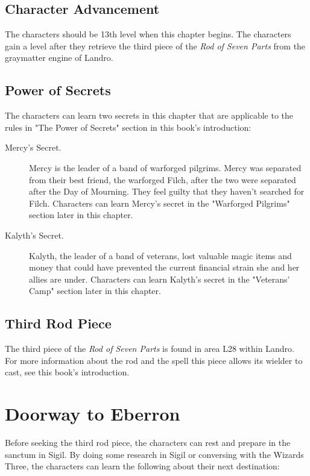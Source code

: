 \documentclass[10pt,a4paper,twoside,bg=print,twocolumn,openany,nodeprecatedcode]{dndbook}
\begin{document}
\subsection{Character Advancement}
The characters should be 13th level when this chapter begins. The characters gain a level after they retrieve the third piece of the \textit{Rod of Seven Parts} from the graymatter engine of Landro.

\subsection{Power of Secrets}
The characters can learn two secrets in this chapter that are applicable to the rules in "The Power of Secrets" section in this book's introduction:


\begin{description}
\item[Mercy's Secret.]
Mercy is the leader of a band of warforged pilgrims. Mercy was separated from their best friend, the warforged Filch, after the two were separated after the Day of Mourning. They feel guilty that they haven't searched for Filch. Characters can learn Mercy's secret in the "Warforged Pilgrims" section later in this chapter.
\item[Kalyth's Secret.]
Kalyth, the leader of a band of veterans, lost valuable magic items and money that could have prevented the current financial strain she and her allies are under. Characters can learn Kalyth's secret in the "Veterans' Camp" section later in this chapter.
\end{description}

\subsection{Third Rod Piece}
The third piece of the \textit{Rod of Seven Parts} is found in area L28 within Landro. For more information about the rod and the spell this piece allows its wielder to cast, see this book's introduction.

\section{Doorway to Eberron}
Before seeking the third rod piece, the characters can rest and prepare in the sanctum in Sigil. By doing some research in Sigil or conversing with the Wizards Three, the characters can learn the following about their next destination:
\end{document}
